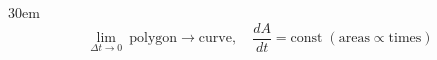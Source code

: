 \documentclass[border=4pt]{standalone}
\begin{document}
\begin{varwidth}{30em}
\large
\[ \lim_{\Delta t \to 0}\ \text{polygon} \to \text{curve},\quad \dfrac{dA}{dt} = \text{const}\;(\text{areas} \propto \text{times}) \]

\end{varwidth}
\end{document}
